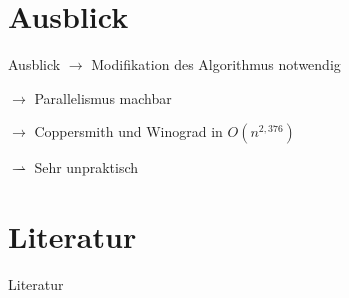 \documentclass{beamer}
\begin{document}
\section{Ausblick}
\begin{frame}{Ausblick}
    $\rightarrow$ Modifikation des Algorithmus notwendig
    \bigskip
    
    $\rightarrow$ Parallelismus machbar
    
    \bigskip
    $\rightarrow$ Coppersmith und Winograd in $O(n^{2,376})$
    
    \bigskip
    \qquad $\rightharpoonup$ Sehr unpraktisch
\end{frame}

\section{Literatur}
\begin{frame}{Literatur}
    \nocite{*}
    
    
\end{frame}
\end{document}
